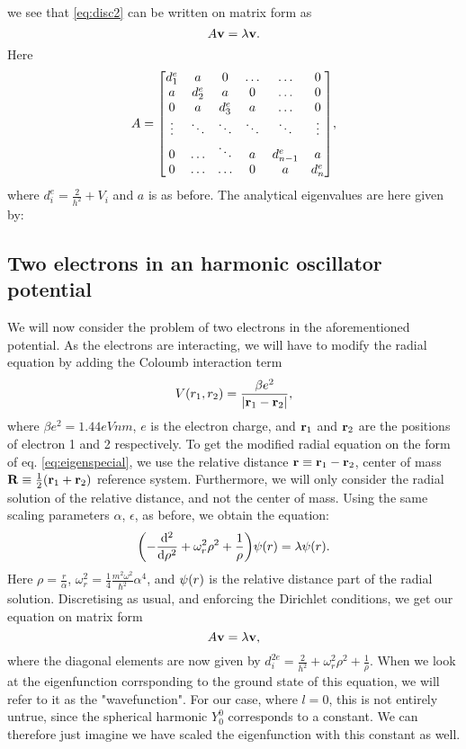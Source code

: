 we see that \ref{eq:disc2} can be written on matrix form as
  \begin{equation}
    A\vb{v} = \lambda \vb{v}.
  \end{equation}
Here
  \begin{equation}
    A =
      \mqty[d_1^e & a & 0 & \hdots & \hdots & 0 \\
            a & d_2^e & a & 0 & \hdots & 0 \\
            0 & a & d_3^e & a & \hdots & 0 \\
            \vdots & \ddots & \ddots & \ddots & \ddots & \vdots \\
            0 & \hdots & \ddots & a & d_{n-1}^e & a \\
            0 & \hdots & \hdots & 0 & a & d_n^e],
  \end{equation}
where $d_i^e = \frac{2}{h^2} + V_i$ and $a$ is as before. The analytical eigenvalues
are here given by:

\subsection{Two electrons in an harmonic oscillator potential}
\label{sec:qmdots}

We will now consider the problem of two electrons in the aforementioned potential.
As the electrons are interacting, we will have to modify the radial equation by adding the Coloumb interaction term
  \begin{equation}
    V\qty(r_1, r_2) = \frac{\beta e^2}{\abs{\vb{r}_1 - \vb{r}_2}},
  \end{equation}
where $\beta e^2 = 1.44 eVnm$, $e$ is the electron charge, and $\vb{r}_1$ and $\vb{r}_2$ are the
positions of electron 1 and 2 respectively.
To get the modified radial equation on the form of eq. \ref{eq:eigenspecial}, we use the relative distance
$\vb{r} \equiv \vb{r}_1 - \vb{r}_2$, center of mass $\vb{R} \equiv \frac{1}{2}\qty(\vb{r}_1 + \vb{r}_2)$
reference system. Furthermore, we will only consider the radial solution of the relative distance, and not the center of mass.
Using the same scaling parameters $\alpha$, $\epsilon$, as before, we obtain the equation:
  \begin{equation}
    \qty(-\dv[2]{}{\rho} + \omega_r^2\rho^2 + \frac{1}{\rho})\psi\qty(r) = \lambda \psi\qty(r).
  \end{equation}
Here $\rho = \frac{r}{\alpha}$, $\omega_r^2 = \frac{1}{4}\frac{m^2\omega^2}{\hbar^2}\alpha^4$, and
$\psi\qty(r)$ is the relative distance part of the radial solution. Discretising
as usual, and enforcing the Dirichlet conditions, we get our equation on matrix form
  \[A\vb{v} = \lambda \vb{v},
  \]
where the diagonal elements are now given by $d_{i}^{2e} = \frac{2}{h^2} + \omega_r^2 \rho^2 + \frac{1}{\rho}$.
When we look at the eigenfunction corrsponding to the ground state of this equation,
we will refer to it as the "wavefunction". For our case, where $l=0$, this is not
entirely untrue, since the spherical harmonic $Y_0^0$ corresponds to a constant.
We can therefore just imagine we have scaled the eigenfunction with this constant as well.

